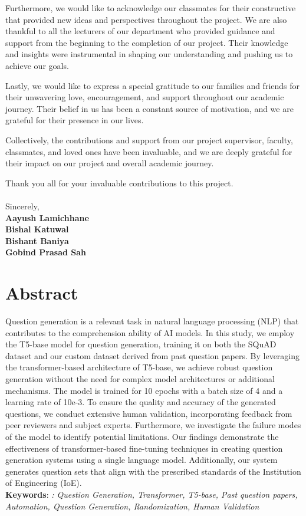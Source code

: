 \documentclass[12pt]{report}
\begin{document}
Furthermore, we would like to acknowledge our classmates for their constructive that provided new ideas and perspectives throughout the project. We are also thankful to all the lecturers of our department who provided guidance and support from the beginning to the completion of our project. Their knowledge and insights were instrumental in shaping our understanding and pushing us to achieve our goals.

Lastly, we would like to express a special gratitude to our families and friends for their unwavering love, encouragement, and support throughout our academic journey. Their belief in us has been a constant source of motivation, and we are grateful for their presence in our lives.

Collectively, the contributions and support from our project supervisor, faculty, classmates, and loved ones have been invaluable, and we are deeply grateful for their impact on our project and overall academic journey.

Thank you all for your invaluable contributions to this project.\\
\\Sincerely,\\
{\bfseries Aayush Lamichhane\\
Bishal Katuwal\\
Bishant Baniya\\
Gobind Prasad Sah\\}
\chapter*{Abstract}
Question generation is a relevant task in natural language processing (NLP) that contributes to the comprehension ability of AI models. In this study, we employ the T5-base model for question generation, training it on both the SQuAD dataset and our custom dataset derived from past question papers. By leveraging the transformer-based architecture of T5-base, we achieve robust question generation without the need for complex model architectures or additional mechanisms. The model is trained for 10 epochs with a batch size of 4 and a learning rate of 10e-3. To ensure the quality and accuracy of the generated questions, we conduct extensive human validation, incorporating feedback from peer reviewers and subject experts. Furthermore, we investigate the failure modes of the model to identify potential limitations. Our findings demonstrate the effectiveness of transformer-based fine-tuning techniques in creating question generation systems using a single language model. Additionally, our system generates question sets that align with the prescribed standards of the Institution of Engineering (IoE).\\
\newline
\textbf{Keywords}: \textit{: Question Generation, Transformer, T5-base,  Past question papers, Automation, Question Generation, Randomization, Human Validation}
\tableofcontents
{}
\listoffigures
{}
\listoftables
{}
\end{document}
